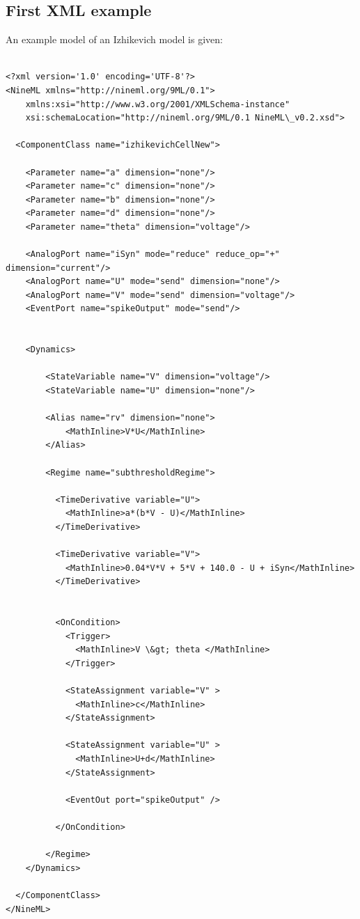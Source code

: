 \documentclass{article}
\begin{document}
\subsection{First XML example}

An example model of an Izhikevich model is given:
%
\begin{lstlisting}

<?xml version='1.0' encoding='UTF-8'?>
<NineML xmlns="http://nineml.org/9ML/0.1">
    xmlns:xsi="http://www.w3.org/2001/XMLSchema-instance"
    xsi:schemaLocation="http://nineml.org/9ML/0.1 NineML\_v0.2.xsd">

  <ComponentClass name="izhikevichCellNew">

    <Parameter name="a" dimension="none"/>
    <Parameter name="c" dimension="none"/>
    <Parameter name="b" dimension="none"/>
    <Parameter name="d" dimension="none"/>
    <Parameter name="theta" dimension="voltage"/>

    <AnalogPort name="iSyn" mode="reduce" reduce_op="+" dimension="current"/>
    <AnalogPort name="U" mode="send" dimension="none"/>
    <AnalogPort name="V" mode="send" dimension="voltage"/>
    <EventPort name="spikeOutput" mode="send"/>


    <Dynamics>

        <StateVariable name="V" dimension="voltage"/>
        <StateVariable name="U" dimension="none"/>

        <Alias name="rv" dimension="none">
            <MathInline>V*U</MathInline>
        </Alias>

        <Regime name="subthresholdRegime">

          <TimeDerivative variable="U">
            <MathInline>a*(b*V - U)</MathInline>
          </TimeDerivative>

          <TimeDerivative variable="V">
            <MathInline>0.04*V*V + 5*V + 140.0 - U + iSyn</MathInline>
          </TimeDerivative>


          <OnCondition>
            <Trigger>
              <MathInline>V \&gt; theta </MathInline>
            </Trigger>

            <StateAssignment variable="V" >
              <MathInline>c</MathInline>
            </StateAssignment>

            <StateAssignment variable="U" >
              <MathInline>U+d</MathInline>
            </StateAssignment>

            <EventOut port="spikeOutput" />

          </OnCondition>

        </Regime>
    </Dynamics>

  </ComponentClass>
</NineML>
\end{lstlisting}
\end{document}
